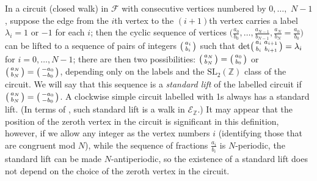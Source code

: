 \documentclass[12pt]{article}
\theoremstyle{definition}
\newcommand{\Z}{\mathbb{Z}}
\newcommand{\SL}[1]{\ensuremath{\mathrm{SL}_{#1}}}
\newcommand{\F}{\mathscr{F}}
\begin{document}
In a circuit (closed walk) in $\F$ with consecutive vertices numbered by $0,\dots,$ \mbox{$N-1$}, suppose the edge from the $i$th vertex to the $(i+1)$th vertex carries a label $\lambda_i = 1$ or $-1$ for each $i$; then the cyclic sequence of vertices $\big(\tfrac{a_0}{b_0},\dots,\tfrac{a_{N-1}}{b_{N-1}},\allowbreak\tfrac{a_N}{b_N}=\tfrac{a_0}{b_0}\big)$ can be lifted to a sequence of pairs of integers $\begin{psmallmatrix}a_i\\b_i\end{psmallmatrix}$ such that $\det\begin{psmallmatrix}a_i&a_{i+1}\\b_i&b_{i+1}\end{psmallmatrix}=\lambda_i$ for $i=0,\dots,N-1$; there are then two possibilities: $\begin{psmallmatrix}a_N\\b_N\end{psmallmatrix} = \begin{psmallmatrix}a_0\\b_0\end{psmallmatrix}$ or $\begin{psmallmatrix}a_N\\b_N\end{psmallmatrix} = \begin{psmallmatrix}-a_0\\-b_0\end{psmallmatrix}$, depending only on the labels and the $\SL2(\Z)$ class of the circuit. We will say that this sequence is a \emph{standard lift} of the labelled circuit if $\begin{psmallmatrix}a_N\\b_N\end{psmallmatrix} = \begin{psmallmatrix}-a_0\\-b_0\end{psmallmatrix}$. A clockwise simple circuit labelled with 1s always has a standard lift. (In terms of \cite{OUmodular}, such standard lift is a walk in $\mathscr{E}_{\Z}$.)
It may appear that the position of the zeroth vertex in the circuit is significant in this definition, however, if we allow any integer as the vertex numbers $i$ (identifying those that are congruent mod $N$), while the sequence of fractions $\tfrac{a_i}{b_i}$ is $N$-periodic, the standard lift can be made $N$-antiperiodic, so the existence of a standard lift does not depend on the choice of the zeroth vertex in the circuit.
\end{document}
